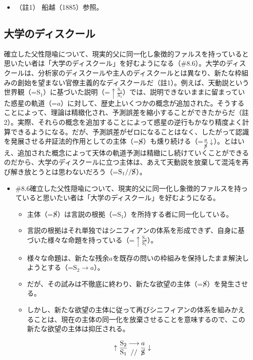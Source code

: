 \begin{itemize}
\tightlist
\item
  （註1） 船越（1885）\cite{Funakoshi}参照。
\end{itemize}

\subsection{大学のディスクール}\label{ux5927ux5b66ux306eux30c7ux30a3ux30b9ux30afux30fcux30eb}

確立した父性隠喩について、現実的父に同一化し象徴的ファルスを持っていると思いたい者は「大学のディスクール」を好むようになる（\#8.6）。大学のディスクールは、分析家のディスクールや主人のディスクールとは異なり、新たな枠組みの創始を望まない官僚主義的なディスクールだ（註1）。例えば、天動説という世界観（=\(\textrm{S}_1\)）に基づいた説明（=\(\uparrow\frac{\textrm{S}_2}{\textrm{S}_1}\)）では、説明できないままに留まっていた惑星の軌道（=\(a\)）に対して、歴史上いくつかの概念が追加された。そうすることによって、理論は精緻化され、予測誤差を縮小することができたからだ（註2）。実際、それらの概念を追加することによって惑星の逆行もかなり精度よく計算できるようになる。だが、予測誤差がゼロになることはなく、したがって認識を発展させる弁証法的作用としての主体（=\(\cancel{\textrm{S}}\)）も燻り続ける（=\(\frac{a}{\cancel{\textrm{S}}}\downarrow\)）。とはいえ、追加された概念によって天体の軌道予測は精緻にし続けていくことができるのだから、大学のディスクールに立つ主体は、あえて天動説を放棄して混沌を再び解き放とうとは思わないだろう（=\(\textrm{S}_1//\cancel{\textrm{S}}\)）。

\begin{note}{}
  \begin{itemize}
    \tightlist
    \item{\#8.6}確立した父性隠喩について、現実的父に同一化し象徴的ファルスを持っていると思いたい者は「大学のディスクール」を好むようになる。
      \begin{itemize}
        \tightlist
        \item 主体（=$\cancel{\textrm{S}}$）は言説の根拠（=$\textrm{S}_1$）を所持する者に同一化している。
        \item 言説の根拠はそれ単独ではシニフィアンの体系を形成できず、自身に基づいた様々な命題を持っている（=$\uparrow\frac{\textrm{S}_2}{\textrm{S}_1}$）。
        \item 様々な命題は、新たな残余$a$を既存の問いの枠組みを保持したまま解決しようとする（=$\textrm{S}_2\rightarrow a$）。
        \item だが、その試みは不徹底に終わり、新たな欲望の主体（=$\cancel{\textrm{S}}$）を発生させる。
        \item しかし、新たな欲望の主体に従って再びシニフィアンの体系を組みかえることは、現在の主体の同一化を放棄させることを意味するので、この新たな欲望の主体は抑圧される。
      \end{itemize}

$$
\uparrow\frac{\mathrm{S_2}}{\mathrm{S_1}}\genfrac{}{}{0pt}{}{\longrightarrow}{//}\frac{a}{\cancel{\textrm{S}}}\downarrow
$$
  \end{itemize}
\end{note}


